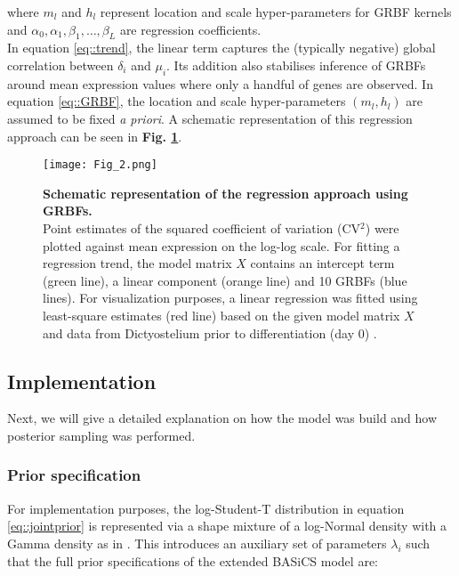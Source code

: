where $m_l$ and $h_l$ represent location and scale hyper-parameters for GRBF kernels and $\alpha_0, \alpha_1, \beta_1, \ldots, \beta_L$ are regression coefficients. \\

In equation \eqref{eq::trend}, the linear term captures the (typically negative) global correlation between $\delta_i$ and $\mu_i$. Its addition also stabilises inference of GRBFs around mean expression values where only a handful of genes are observed. In equation \eqref{eq::GRBF}, the location and scale hyper-parameters $(m_l, h_l)$ are assumed to be fixed \emph{a priori}. A schematic representation of this regression approach can be seen in \textbf{Fig. \ref{fig2:GRBFs}}.

\begin{figure}[!h]
\centering
\texttt{[image: Fig\_2.png]}
\caption[Schematic representation of the regression approach using GRBFs]{\textbf{Schematic representation of the regression approach using GRBFs.}\\
Point estimates of the squared coefficient of variation (CV$^2$) were plotted against mean expression on the log-log scale. For fitting a regression trend, the model matrix $X$ contains an intercept term (green line), a linear component (orange line) and 10 GRBFs (blue lines). For visualization purposes, a linear regression was fitted using least-square estimates (red line) based on the given model matrix $X$ and data from Dictyostelium prior to differentiation (day 0) \citep{Antolovic2017}.}
\label{fig2:GRBFs}
\end{figure}


\subsection{Implementation}

Next, we will give a detailed explanation on how the model was build and how posterior sampling was performed.  


\subsubsection{Prior specification}

For implementation purposes, the log-Student-T distribution in equation \eqref{eq::jointprior} is represented via a shape mixture of a log-Normal density with a Gamma density as in \cite{Vallejos2015}. This introduces an auxiliary set of parameters $\lambda_i$ such that the full prior specifications of the extended BASiCS model are:

